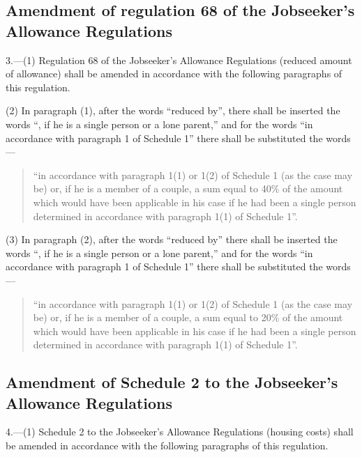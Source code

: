 \documentclass[12pt,a4paper]{article}
\begin{document}
\subsection[3. Amendment of regulation 68 of the Jobseeker’s Allowance Regulations]{Amendment of regulation 68 of the Jobseeker’s Allowance Regulations}

3.—(1) Regulation 68 of the Jobseeker’s Allowance Regulations (reduced amount of allowance) shall be amended in accordance with the following paragraphs of this regulation.

(2) In paragraph (1), after the words “reduced by”, there shall be inserted the words “, if he is a single person or a lone parent,” and for the words “in accordance with paragraph 1 of Schedule 1” there shall be substituted the words—
\begin{quotation}
“in accordance with paragraph 1(1) or 1(2) of Schedule 1 (as the case may be) or, if he is a member of a couple, a sum equal to 40\% of the amount which would have been applicable in his case if he had been a single person determined in accordance with paragraph 1(1) of Schedule 1”.
\end{quotation}

(3) In paragraph (2), after the words “reduced by” there shall be inserted the words “, if he is a single person or a lone parent,” and for the words “in accordance with paragraph 1 of Schedule 1” there shall be substituted the words—
\begin{quotation}
“in accordance with paragraph 1(1) or 1(2) of Schedule 1 (as the case may be) or, if he is a member of a couple, a sum equal to 20\% of the amount which would have been applicable in his case if he had been a single person determined in accordance with paragraph 1(1) of Schedule 1”.
\end{quotation}

\subsection[4. Amendment of Schedule 2 to the Jobseeker’s Allowance Regulations]{Amendment of Schedule 2 to the Jobseeker’s Allowance Regulations}

4.—(1) Schedule 2 to the Jobseeker’s Allowance Regulations (housing costs) shall be amended in accordance with the following paragraphs of this regulation.
\end{document}
